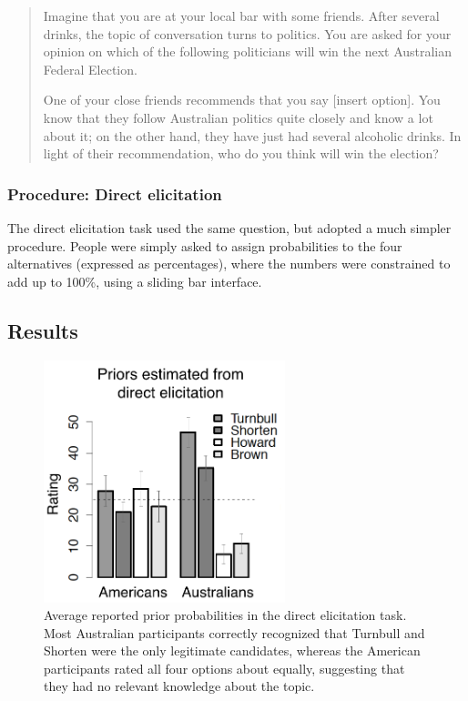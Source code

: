 \documentclass[doc]{apa6}
\begin{document}
\begin{quotation}
Imagine that you are at your local bar with some friends. After several drinks, the topic of conversation turns to politics. You are asked for your opinion on which of the following politicians will win the next Australian Federal Election. 

One of your close friends recommends that you say [insert option]. You know that they follow Australian politics quite closely and know a lot about it; on the other hand, they have just had several alcoholic drinks. In light of their recommendation, who do you think will win the election?
\end{quotation}


\bigskip
\subsubsection{Procedure: Direct elicitation}

The direct elicitation task used the same question, but adopted a much simpler procedure. People were simply asked to assign probabilities to the four alternatives (expressed as percentages), where the numbers were constrained to add up to 100\%, using a sliding bar interface.

\subsection{Results}

\begin{figure}[t]
\begin{center}
\includegraphics[width=7cm]{priorsozelection.png}
\caption{\small{Average reported prior probabilities in the {\sc direct elicitation} task. Most Australian participants correctly recognized that Turnbull and Shorten were the only legitimate candidates, whereas the American participants rated all four options about equally, suggesting that they had no relevant knowledge about the topic. }}
\label{direct}
\end{center}
\end{figure}
\end{document}
